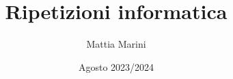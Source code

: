 
\usepackage{layouts}
\usepackage{tabularx}
\usepackage{makecell}
\usetikzlibrary{patterns}
\usepackage{contour}

\usepackage{pgf-umlcd}

\makeatletter
\newcommand\HREF[2]{\hyper@linkurl{#2}{#1}}
\makeatother

\title{Ripetizioni informatica}
\author{Mattia Marini}
\date{Agosto 2023/2024}

\maketitle
{}
\tableofcontents
\listofexercises

\newpage
